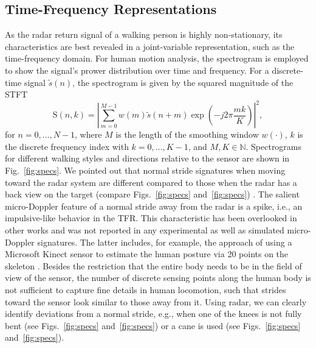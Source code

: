 \subsection{Time-Frequency Representations}
As the radar return signal of a walking person is highly non-stationary, its characteristics are best revealed in a joint-variable representation, such as the time-frequency domain. For human motion analysis, the spectrogram is employed to show the signal's prower distribution over time and frequency. For a discrete-time signal $\tilde{s}(n)$, the spectrogram is given by the squared magnitude of the STFT \cite{Opp99}
\begin{equation}
\mathrm{S}(n,k) = \left| \sum_{m=0}^{M-1} w(m) \tilde{s}(n+m) \exp{\left(-j 2 \pi \frac{mk}{K}\right)}\right|^2, 
\label{eq:spectrogram}
\end{equation}
for $n = 0, \dots, N-1$, where $M$ is the length of the smoothing window $w(\cdot)$, $k$ is the discrete frequency index with $k = 0, \dots, K-1$, and $M, K \in \mathbb{N}$. 
Spectrograms for different walking styles and directions relative to the sensor are shown in Fig.~\ref{fig:specs}. 
We pointed out that normal stride signatures when moving toward the radar system are different compared to those when the radar has a back view on the target (compare Figs.~\ref{fig:specs} and~\ref{fig:specs}) \cite{Sei17}. The salient micro-Doppler feature of a normal stride away from the radar is a spike, i.e., an impulsive-like behavior in the TFR. This characteristic has been overlooked in other works and was not reported in any experimental as well as simulated micro-Doppler signatures. The latter includes, for example, the approach of using a Microsoft Kinect sensor to estimate the human posture via 20 points on the skeleton \cite{Ero15}. Besides the restriction that the entire body needs to be in the field of view of the sensor, the number of discrete sensing points along the human body is not sufficient to capture fine details in human locomotion, such that strides toward the sensor look similar to those away from it. 
Using radar, we can clearly identify deviations from a normal stride, e.g., when one of the knees is not fully bent (see Figs.~\ref{fig:specs} and~\ref{fig:specs}) or a cane is used (see Figs.~\ref{fig:specs} and~\ref{fig:specs}). 

